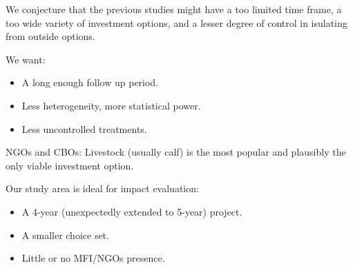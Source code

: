\begin{frame}{}
We conjecture that the previous studies might have a too limited time frame, a too wide variety of investment options, and a lesser degree of control in isulating from outside options.

\vspace{2ex}
\pause
We want:
\begin{itemize}
\vspace{1.0ex}\setlength{\itemsep}{1.0ex}\setlength{\baselineskip}{12pt}
\pause
\item	A long enough follow up period.
\pause
\item	Less heterogeneity, more statistical power.
\pause
\item	Less uncontrolled treatments.
\end{itemize}
\vspace{2ex}
\pause
NGOs and CBOs: Livestock (usually calf) is the most popular and plausibly the only viable investment option. 

\vspace{2ex}
\pause
Our study area is ideal for impact evaluation:
\begin{itemize}
\vspace{1.0ex}\setlength{\itemsep}{1.0ex}\setlength{\baselineskip}{12pt}
\pause
\item	A 4-year (unexpectedly extended to 5-year) project.
\pause
\item	A smaller choice set.
\pause
\item	Little or no MFI/NGOs presence.
\end{itemize} 
\end{frame}

